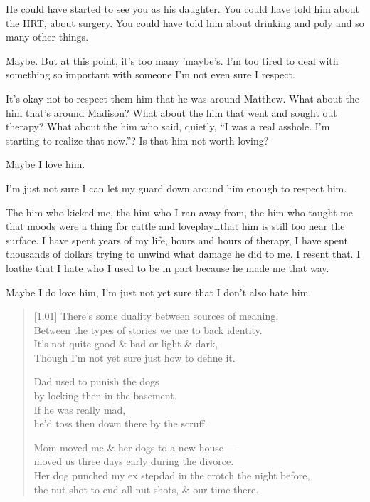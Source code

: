\begin{paracol}{2}
\begin{leftcolumn}
\begin{ally}
He could have started to see you as his daughter. You could have told him about the HRT, about surgery. You could have told him about drinking and poly and so many other things.
\end{ally}
Maybe. But at this point, it's too many 'maybe's. I'm too tired to deal with something so important with someone I'm not even sure I respect.

\begin{ally}
It's okay not to respect them him that he was around Matthew. What about the him that's around Madison? What about the him that went and sought out therapy? What about the him who said, quietly, ``I was a real asshole. I'm starting to realize that now.''? Is that him not worth loving?
\end{ally}
Maybe I love him.

I'm just not sure I can let my guard down around him enough to respect him.

The him who kicked me, the him who I ran away from, the him who taught me that moods were a thing for cattle and loveplay\ldots{}that him is still too near the surface. I have spent years of my life, hours and hours of therapy, I have spent thousands of dollars trying to unwind what damage he did to me. I resent that. I loathe that I hate who I used to be in part because he made me that way.

Maybe I do love him, I'm just not yet sure that I don't also hate him.
\newpage

\begin{verse}[1.01\textwidth]
  There's some duality between sources of meaning,\\
  \vin Between the types of stories we use to back identity.\\
  It's not quite good \& bad or light \& dark,\\
  \vin Though I'm not yet sure just how to define it.

  Dad used to punish the dogs\\
  \vin by locking then in the basement.\\
  If he was really mad,\\
  \vin he'd toss then down there by the scruff.

  Mom moved me \& her dogs to a new house ---\\
  \vin moved us three days early during the divorce.\\
  Her dog punched my ex stepdad in the crotch the night before,\\
  \vin the nut-shot to end all nut-shots, \& our time there.


\end{verse}
\end{leftcolumn}
\end{paracol}
